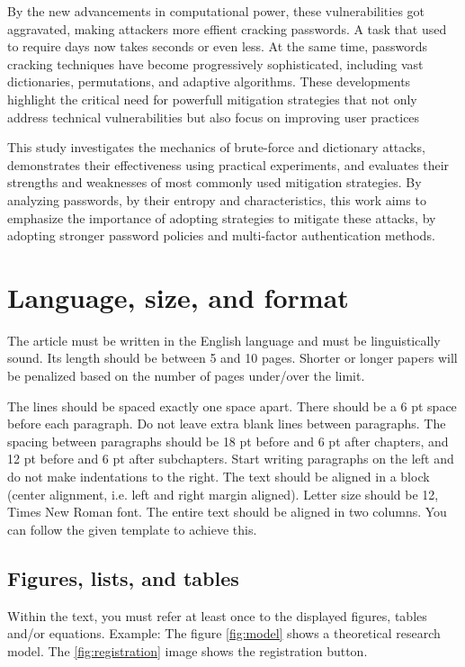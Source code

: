 \documentclass{comjnl}
\begin{document}
By the new advancements in computational power, these vulnerabilities got aggravated, making attackers more effient cracking passwords. A task that used to require days now takes seconds or even less. At the same time, passwords cracking techniques have become progressively sophisticated, including vast dictionaries, permutations, and adaptive algorithms. These developments highlight the critical need for powerfull mitigation strategies that not only address technical vulnerabilities but also focus on improving user practices 

This study investigates the mechanics of brute-force and dictionary attacks, demonstrates their effectiveness using practical experiments, and evaluates their strengths and weaknesses of most commonly used mitigation strategies. By analyzing passwords, by their entropy and characteristics, this work aims to emphasize the importance of adopting strategies to mitigate these attacks, by adopting stronger password policies and multi-factor authentication methods.

\section{Language, size, and format} 

The article must be written in the English language and must be linguistically sound. Its length should be between 5 and 10 pages. Shorter or longer papers will be penalized based on the number of pages under/over the limit. 

The lines should be spaced exactly one space apart. There should be a 6 pt space before each paragraph. Do not leave extra blank lines between paragraphs. The spacing between paragraphs should be 18 pt before and 6 pt after chapters, and 12 pt before and 6 pt after subchapters. Start writing paragraphs on the left and do not make indentations to the right. The text should be aligned in a block (center alignment, i.e. left and right margin aligned). Letter size should be 12, Times New Roman font. The entire text should be aligned in two columns. You can follow the given template to achieve this.

\subsection{Figures, lists, and tables}

Within the text, you must refer at least once to the displayed figures, tables and/or equations. Example: The figure \ref{fig:model} shows a theoretical research model. The \ref{fig:registration} image shows the registration button.
\end{document}

